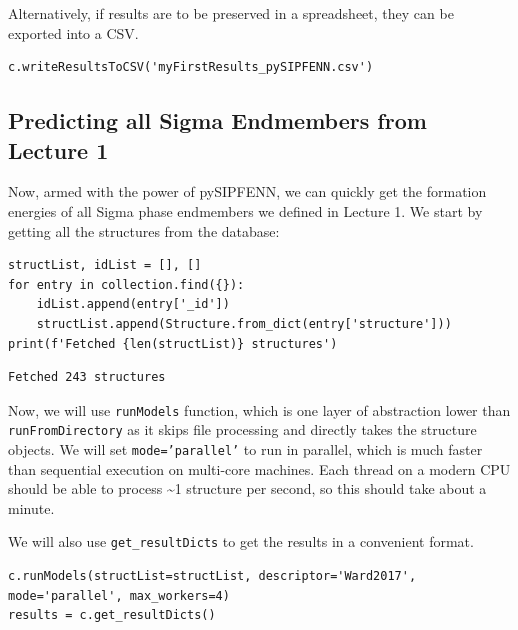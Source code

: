 Alternatively, if results are to be preserved in a spreadsheet, they can
be exported into a CSV.

\begin{verbatim}
c.writeResultsToCSV('myFirstResults_pySIPFENN.csv')
\end{verbatim}

\hypertarget{predicting-all-sigma-endmembers-from-lecture-1}{%
\subsection{Predicting all Sigma Endmembers from Lecture
1}\label{pysipfenntutorial2:predicting-all-sigma-endmembers-from-lecture-1}}

Now, armed with the power of pySIPFENN, we can quickly get the formation
energies of all Sigma phase endmembers we defined in Lecture 1. We start
by getting all the structures from the database:

\begin{verbatim}
structList, idList = [], []
for entry in collection.find({}):
    idList.append(entry['_id'])
    structList.append(Structure.from_dict(entry['structure']))
print(f'Fetched {len(structList)} structures')
\end{verbatim}

\begin{verbatim}
Fetched 243 structures
\end{verbatim}

Now, we will use \texttt{runModels} function, which is
one layer of abstraction lower than
\texttt{runFromDirectory} as it skips file processing
and directly takes the structure objects. We will set
\texttt{mode='parallel'} to run in parallel, which is
much faster than sequential execution on multi-core machines. Each
thread on a modern CPU should be able to process \textasciitilde1
structure per second, so this should take about a minute.

We will also use \texttt{get\_resultDicts} to get the
results in a convenient format.

\begin{verbatim}
c.runModels(structList=structList, descriptor='Ward2017', mode='parallel', max_workers=4)
results = c.get_resultDicts()
\end{verbatim}

